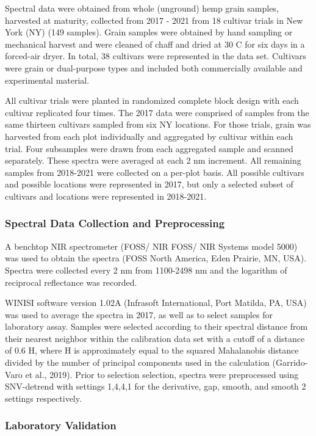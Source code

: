 \documentclass[
]{agujournal2019}
\begin{document}
Spectral data were obtained from whole (unground) hemp grain samples,
harvested at maturity, collected from 2017 - 2021 from 18 cultivar
trials in New York (NY) (149 samples). Grain samples were obtained by
hand sampling or mechanical harvest and were cleaned of chaff and dried
at 30 C for six days in a forced-air dryer. In total, 38 cultivars were
represented in the data set. Cultivars were grain or dual-purpose types
and included both commercially available and experimental material.

All cultivar trials were planted in randomized complete block design
with each cultivar replicated four times. The 2017 data were comprised
of samples from the same thirteen cultivars sampled from six NY
locations. For those trials, grain was harvested from each plot
individually and aggregated by cultivar within each trial. Four
subsamples were drawn from each aggregated sample and scanned
separately. These spectra were averaged at each 2 nm increment. All
remaining samples from 2018-2021 were collected on a per-plot basis. All
possible cultivars and possible locations were represented in 2017, but
only a selected subset of cultivars and locations were represented in
2018-2021.

\subsubsection{Spectral Data Collection and
Preprocessing}\label{spectral-data-collection-and-preprocessing}

A benchtop NIR spectrometer (FOSS/ NIR FOSS/ NIR Systems model 5000) was
used to obtain the spectra (FOSS North America, Eden Prairie, MN, USA).
Spectra were collected every 2 nm from 1100-2498 nm and the logarithm of
reciprocal reflectance was recorded.

WINISI software version 1.02A (Infrasoft International, Port Matilda,
PA, USA) was used to average the spectra in 2017, as well as to select
samples for laboratory assay. Samples were selected according to their
spectral distance from their nearest neighbor within the calibration
data set with a cutoff of a distance of 0.6 H, where H is approximately
equal to the squared Mahalanobis distance divided by the number of
principal components used in the calculation (Garrido-Varo et al.,
2019). Prior to selection selection, spectra were preprocessed using
SNV-detrend with settings 1,4,4,1 for the derivative, gap, smooth, and
smooth 2 settings respectively.

\subsubsection{Laboratory Validation}\label{laboratory-validation}
\end{document}

